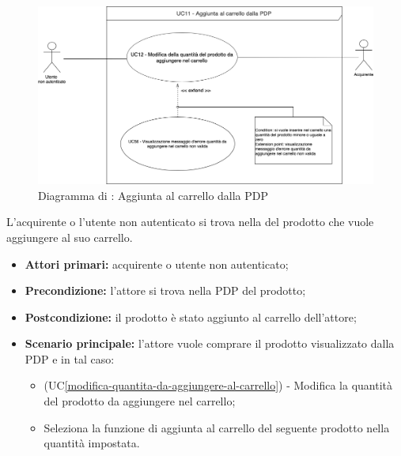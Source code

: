 
\label{aggiunta-carrello-pdp}

\begin{figure}[H]
	\centering
	\includegraphics[scale=0.4]{Immagini/DiagrammiUC/Acquirente/AggiuntaProdottiCarrelloPDP.png}
	\caption{Diagramma di \actualUC: Aggiunta al carrello dalla PDP}
	\label{fig:aggiunta-carrello-pdp}
\end{figure}

L'acquirente o l'utente non autenticato si trova nella  del prodotto che vuole aggiungere al suo carrello.
\begin{itemize}
    \item \textbf{Attori primari:} acquirente o utente non autenticato;
    \item \textbf{Precondizione:} l'attore si trova nella PDP del prodotto;
    \item \textbf{Postcondizione:} il prodotto è stato aggiunto al carrello dell'attore;
    \item \textbf{Scenario principale:} l'attore vuole comprare il prodotto visualizzato dalla PDP e in tal caso:
    \begin{itemize}
        \item (UC\ref{modifica-quantita-da-aggiungere-al-carrello}) - Modifica la quantità del prodotto da aggiungere nel carrello;
        \item Seleziona la funzione di aggiunta al carrello del seguente prodotto nella quantità impostata.
    \end{itemize}
\end{itemize}



